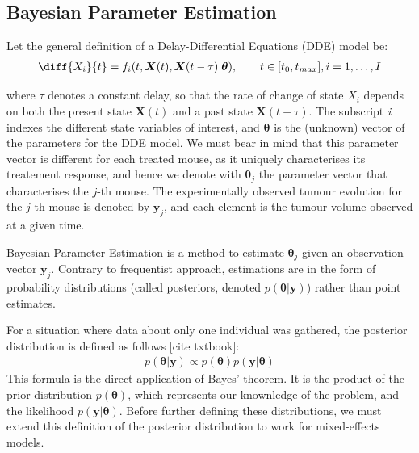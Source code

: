 \documentclass[11pt]{article}
\begin{document}
\subsection{Bayesian Parameter Estimation}
Let the general definition of a Delay-Differential Equations (DDE) model be: 
\begin{align*}
    \diff{X_i}{t} = f_i(t, \boldsymbol{X}(t), \boldsymbol{X}(t-\tau)| \boldsymbol{\theta}), \qquad t \in [t_0, t_{max}], i = 1, \ldots, I
\end{align*}

where $\tau$ denotes a constant delay, so that the rate of change of state $X_i$ depends on both the present state $\boldsymbol{X}(t)$ and a past state $\boldsymbol{X}(t-\tau)$. The subscript \textit{i} indexes the different state variables of interest, and $\boldsymbol{\theta}$ is the (unknown) vector of the parameters for the DDE model. We must bear in mind that this parameter vector is different for each treated mouse, as it uniquely characterises its treatement response, and hence we denote with $\boldsymbol{\theta}_j$ the parameter vector that characterises the $j$-th mouse. The experimentally observed tumour evolution for the $j$-th mouse is denoted by $\boldsymbol{y}_j$, and each element is the tumour volume observed at a given time.

Bayesian Parameter Estimation is a method to estimate $\boldsymbol{\theta}_j$ given an observation vector $\boldsymbol{y}_j$. Contrary to frequentist approach, estimations are in the form of probability distributions (called posteriors, denoted $p(\boldsymbol{\theta}|\boldsymbol{y})$) rather than point estimates. 

For a situation where data about only one individual was gathered, the posterior distribution is defined as follows [cite txtbook]:
\begin{align*}
    p(\boldsymbol{\theta} | \boldsymbol{y}) \propto p(\boldsymbol{\theta})p(\boldsymbol{y}|\boldsymbol{\theta})
\end{align*} 
This formula is the direct application of Bayes' theorem. It is the product of the prior distribution $p(\boldsymbol{\theta})$, which represents our knownledge of the problem, and the likelihood $p(\boldsymbol{y} | \boldsymbol{\theta})$. Before further defining these distributions, we must extend this definition of the posterior distribution to work for mixed-effects models. 
\end{document}
